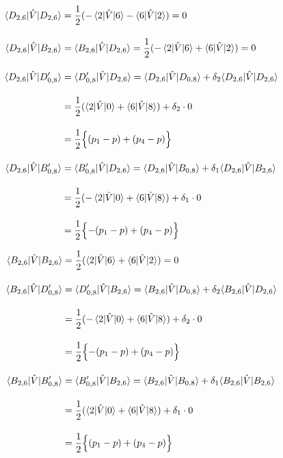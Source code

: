 \begin{align}
    \langle{D_{2,6}|\hat{V}|D_{2,6}}\rangle
    &
    =\frac{1}{2}(-\braket{2|\hat{V}|6} - \braket{6|\hat{V}|2})
    =0\\[10pt]
    \langle{D_{2,6}|\hat{V}|B_{2,6}}\rangle
    &=\langle{B_{2,6}|\hat{V}|D_{2,6}}\rangle
    =\frac{1}{2}(-\braket{2|\hat{V}|6} + \braket{6|\hat{V}|2})
    =0\\[10pt]
    \langle{D_{2,6}|\hat{V}|D^\prime_{0,8}}\rangle
    &=\langle{D^\prime_{0,8}|\hat{V}|D_{2,6}}\rangle
    =\braket{D_{2,6}|\hat{V}|D_{0,8}} 
    +\delta_2\langle{D_{2,6}|\hat{V}|D_{2,6}}\rangle\nn[10pt]
    &=\frac{1}{2}(\braket{2|\hat{V}|0}+\braket{6|\hat{V}|8})
    +\delta_2\cdot0\nn[10pt]
    &=\frac{1}{2}\Bigl\{
    (p_1-p) + (p_4-p)
    \Bigr\}\\[10pt]
   \langle{D_{2,6}|\hat{V}|B^\prime_{0,8}}\rangle
   &=\langle{B^\prime_{0,8}|\hat{V}|D_{2,6}}\rangle
    =\braket{D_{2,6}|\hat{V}|B_{0,8}} 
    +\delta_1\langle{D_{2,6}|\hat{V}|B_{2,6}}\rangle\nn[10pt]
    &=\frac{1}{2}(-\braket{2|\hat{V}|0}+\braket{6|\hat{V}|8})
    +\delta_1\cdot0\nn[10pt]
    &=\frac{1}{2}\Bigl\{
    -(p_1-p) + (p_4-p)
    \Bigr\}
\end{align}





\begin{align}
    \langle{B_{2,6}|\hat{V}|B_{2,6}}\rangle
    &
    =\frac{1}{2}(\braket{2|\hat{V}|6} + \braket{6|\hat{V}|2})
    =0\\[10pt]
    \langle{B_{2,6}|\hat{V}|D^\prime_{0,8}}\rangle
    &=\langle{D^\prime_{0,8}|\hat{V}|B_{2,6}}\rangle
    =\braket{B_{2,6}|\hat{V}|D_{0,8}} 
    +\delta_2\langle{B_{2,6}|\hat{V}|D_{2,6}}\rangle\nn[10pt]
    &=\frac{1}{2}(-\braket{2|\hat{V}|0}+\braket{6|\hat{V}|8})
    +\delta_2\cdot0\nn[10pt]
    &=\frac{1}{2}\Bigl\{
    -(p_1-p) + (p_4-p)
    \Bigr\}\\[10pt]
   \langle{B_{2,6}|\hat{V}|B^\prime_{0,8}}\rangle
   &=\langle{B^\prime_{0,8}|\hat{V}|B_{2,6}}\rangle
    =\braket{B_{2,6}|\hat{V}|B_{0,8}} 
    +\delta_1\langle{B_{2,6}|\hat{V}|B_{2,6}}\rangle\nn[10pt]
    &=\frac{1}{2}(\braket{2|\hat{V}|0}+\braket{6|\hat{V}|8})
    +\delta_1\cdot0\nn[10pt]
    &=\frac{1}{2}\Bigl\{
    (p_1-p) + (p_4-p)
    \Bigr\}
\end{align}





